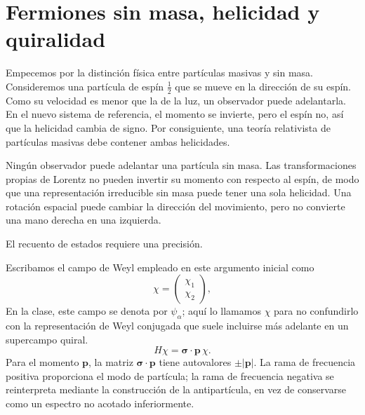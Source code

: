 \section{Fermiones sin masa, helicidad y quiralidad}

Empecemos por la distinción física entre partículas masivas y sin masa. Consideremos una partícula de espín \(\tfrac12\) que se mueve en la dirección de su espín. Como su velocidad es menor que la de la luz, un observador puede adelantarla. En el nuevo sistema de referencia, el momento se invierte, pero el espín no, así que la helicidad cambia de signo. Por consiguiente, una teoría relativista de partículas masivas debe contener ambas helicidades.

Ningún observador puede adelantar una partícula sin masa. Las transformaciones propias de Lorentz no pueden invertir su momento con respecto al espín, de modo que una representación irreducible sin masa puede tener una sola helicidad. Una rotación espacial puede cambiar la dirección del movimiento, pero no convierte una mano derecha en una izquierda.

\begin{classroomqa}
\end{classroomqa}

El recuento de estados requiere una precisión.

Escribamos el campo de Weyl empleado en este argumento inicial como
\begin{equation}
\chi=
\begin{pmatrix}
\chi_1\\
\chi_2
\end{pmatrix},
\end{equation}
En la clase, este campo se denota por \(\psi_\alpha\); aquí lo llamamos \(\chi\) para no confundirlo con la representación de Weyl conjugada que suele incluirse más adelante en un supercampo quiral.
\begin{equation}
H\chi=\boldsymbol{\sigma}\cdot\mathbf p\,\chi.
\label{eq:l8-weyl-hamiltonian}
\end{equation}
Para el momento \(\mathbf p\), la matriz \(\boldsymbol{\sigma}\cdot\mathbf p\) tiene autovalores \(\pm|\mathbf p|\). La rama de frecuencia positiva proporciona el modo de partícula; la rama de frecuencia negativa se reinterpreta mediante la construcción de la antipartícula, en vez de conservarse como un espectro no acotado inferiormente.

